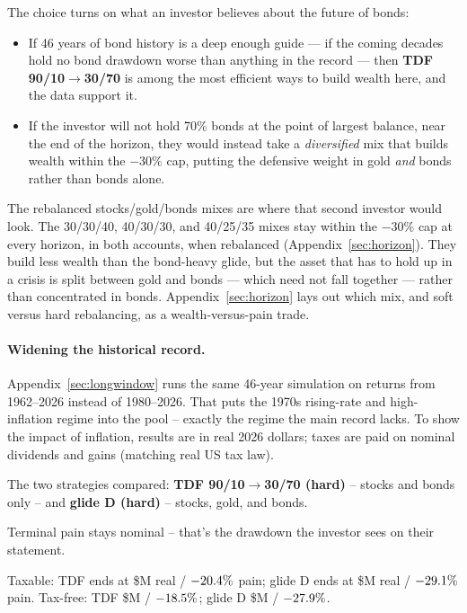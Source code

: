 \documentclass[11pt]{article}
\begin{document}
The choice turns on what an investor believes about the future of bonds:
\begin{itemize}
\item If 46 years of bond history is a deep enough guide --- if the coming decades hold no bond drawdown
worse than anything in the record --- then \textbf{TDF 90/10$\to$30/70} is among the most efficient ways
to build wealth here, and the data support it.
\item If the investor will not hold 70\% bonds at the point of largest balance, near the end of the
horizon, they would instead take a \emph{diversified} mix that builds wealth within the $-30\%$ cap,
putting the defensive weight in gold \emph{and} bonds rather than bonds alone.
\end{itemize}

\noindent The rebalanced stocks/gold/bonds mixes are where that second investor would look. The
30/30/40, 40/30/30, and 40/25/35 mixes stay within the $-30\%$ cap at every horizon, in both accounts,
when rebalanced (Appendix~\ref{sec:horizon}). They build less wealth than the bond-heavy glide, but the
asset that has to hold up in a crisis is split between gold and bonds --- which need not fall together
--- rather than concentrated in bonds. Appendix~\ref{sec:horizon} lays out which mix, and soft versus
hard rebalancing, as a wealth-versus-pain trade.

\paragraph{Widening the historical record.} Appendix~\ref{sec:longwindow} runs the same 46-year
simulation on returns from 1962--2026 instead of 1980--2026. That puts the 1970s rising-rate and
high-inflation regime into the pool -- exactly the regime the main record lacks. To show the impact
of inflation, results are in real 2026 dollars; taxes are paid on nominal dividends and gains
(matching real US tax law).

\medskip

\noindent The two strategies compared: \textbf{TDF 90/10$\to$30/70 (hard)} -- stocks and bonds only
-- and \textbf{glide D (hard)} -- stocks, gold, and bonds.

\medskip

\noindent Terminal pain stays nominal -- that's the drawdown the investor sees on their statement.

\medskip

\noindent Taxable: TDF ends at \$\LongwindowTdfTxWealth M real / $-20.4\%$ pain;
glide D ends at \$\LongwindowGldTxWealth M real / $-29.1\%$ pain. Tax-free: TDF
\$\LongwindowTdfTfWealth M / $-18.5\%$; glide D \$\LongwindowGldTfWealth M /
$-27.9\%$.
\end{document}
